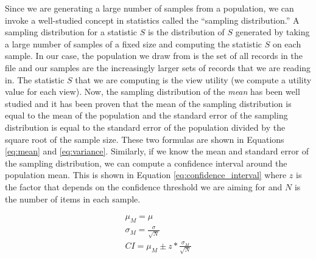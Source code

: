 Since we are generating a large number of samples from a population, we can
invoke a well-studied concept in statistics called the ``sampling distribution.'' 
A sampling distribution for a statistic $S$ is the distribution of
$S$ generated by taking a large number of samples of a fixed size and computing
the statistic $S$ on each sample.
In our case, the population we draw from is the set of all records in the file
and our samples are the increasingly larger sets of records that we are reading in.
The statistic $S$ that we are computing is the view utility (we
compute a utility value for each view).
Now, the sampling distribution of the {\it mean} has been well studied and it
has been proven that the mean of the sampling distribution is equal to the mean of the
population and the standard error of the sampling distribution is equal to the
standard error of the population divided by the square root of the sample size. 
These two formulas are shown in Equations \ref{eq:mean} and \ref{eq:variance}.
Similarly, if we know the mean and standard error of the sampling distribution,
we can compute a confidence interval around the population mean. This is shown
in Equation \ref{eq:confidence_interval} where $z$ is the factor that depends on the
confidence threshold we are aiming for and $N$ is the number of items
in each sample.

\begin{eqnarray}
\label{eqnarray:mean_and_variance}
\mu_M = \mu \label{eq:mean}\\
\sigma_{M} = \frac{\sigma}{\sqrt{N}} \label{eq:variance}\\
CI = \mu_M \pm z \ast \frac{\sigma_M}{\sqrt{N}}\label{eq:confidence_interval}
\end{eqnarray}

